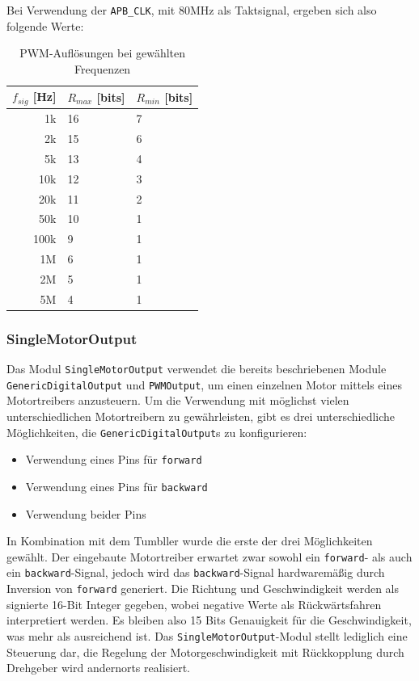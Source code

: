 Bei Verwendung der \texttt{APB\_CLK}, mit 80MHz als Taktsignal,
ergeben sich also folgende Werte:
\begin{table}[H]
    \centering
    \begin{tabular}{r|l|l}
    $f_{sig}$ [Hz]  & $R_{max}$ [bits] & $R_{min}$ [bits] \\ \hline
    1k        & 16 & 7 \\
    2k        & 15 & 6 \\
    5k        & 13 & 4 \\
    10k       & 12 & 3 \\
    20k       & 11 & 2 \\
    50k       & 10 & 1 \\
    100k      & 9  & 1 \\
    1M        & 6  & 1 \\
    2M        & 5  & 1 \\
    5M        & 4  & 1 \\
    \end{tabular}
    \caption{PWM-Auflösungen bei gewählten Frequenzen}
    \label{tab:pwm-resolution}
\end{table}

\subsubsection{SingleMotorOutput}
Das Modul \texttt{SingleMotorOutput} verwendet die bereits beschriebenen Module
\texttt{GenericDigitalOutput} und \texttt{PWMOutput},
um einen einzelnen Motor mittels eines Motortreibers anzusteuern.
Um die Verwendung mit möglichst vielen unterschiedlichen Motortreibern zu gewährleisten,
gibt es drei unterschiedliche Möglichkeiten, die \texttt{GenericDigitalOutput}s zu konfigurieren:
\begin{itemize}
    \item Verwendung eines Pins für \texttt{forward}
    \item Verwendung eines Pins für \texttt{backward}
    \item Verwendung beider Pins
\end{itemize}
In Kombination mit dem Tumbller wurde die erste der drei Möglichkeiten gewählt.
%
Der eingebaute Motortreiber erwartet zwar sowohl ein \texttt{forward}- als auch ein \texttt{backward}-Signal,
jedoch wird das \texttt{backward}-Signal hardwaremäßig durch Inversion von \texttt{forward} generiert.
%
Die Richtung und Geschwindigkeit werden als signierte 16-Bit Integer gegeben,
wobei negative Werte als Rückwärtsfahren interpretiert werden.
%
Es bleiben also 15 Bits Genauigkeit für die Geschwindigkeit,
was mehr als ausreichend ist.
%
Das \texttt{SingleMotorOutput}-Modul stellt lediglich eine Steuerung dar,
die Regelung der Motorgeschwindigkeit mit Rückkopplung durch Drehgeber wird andernorts realisiert.

